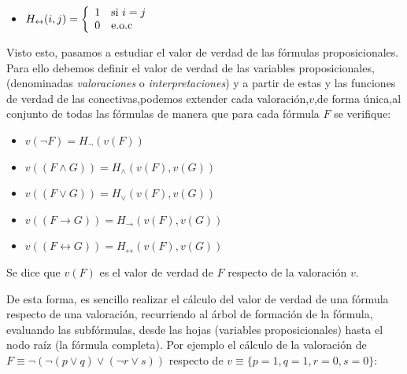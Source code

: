 \documentclass[a4paper]{report}
\begin{document}
\begin{itemize}
\begin{multicols}{2}
\begin{itemize}
\item 
$H_{\leftrightarrow}(i,j) = \left\lbrace \begin{array}{l l}
1 & \textrm{si } i = j\\
0 & \textrm{e.o.c}\\
\end{array} \right.$
\end{itemize}
\end{multicols}

\end{itemize}

Visto esto, pasamos a estudiar el valor de verdad de las fórmulas proposicionales. Para ello debemos definir el valor de verdad de las variables proposicionales, (denominadas \textit{valoraciones} o \textit{interpretaciones}) y a partir de estas y las funciones de verdad de las conectivas,podemos extender cada valoración,$v$,de forma única,al conjunto de todas las fórmulas de manera que para cada fórmula $F$ se verifique:

\begin{multicols}{2}
\begin{itemize}
\item $v(\neg F)= H_{\neg}(v(F))$
\item $v((F \wedge G))= H_{\wedge}(v(F), v(G))$
\item $v((F \vee G))= H_{\vee}(v(F), v(G))$
\item $v((F \rightarrow G))= H_{\rightarrow}(v(F), v(G))$
\item $v((F \leftrightarrow G))= H_{\leftrightarrow}(v(F), v(G))$
\end{itemize}
\end{multicols}

Se dice que $v(F)$ es el valor de verdad de $F$ respecto de la valoración $v$.

De esta forma, es sencillo realizar el cálculo del valor de verdad de una fórmula respecto de una valoración, recurriendo al árbol de formación de la fórmula, evaluando las subfórmulas, desde las hojas (variables proposicionales) hasta el nodo raíz (la fórmula completa). Por ejemplo el cálculo de la valoración de $F \equiv \neg(\neg(p \vee q)\vee(\neg r \vee s))$ respecto de $v \equiv \{p=1, q=1, r=0, s=0\}$:
\end{document}

